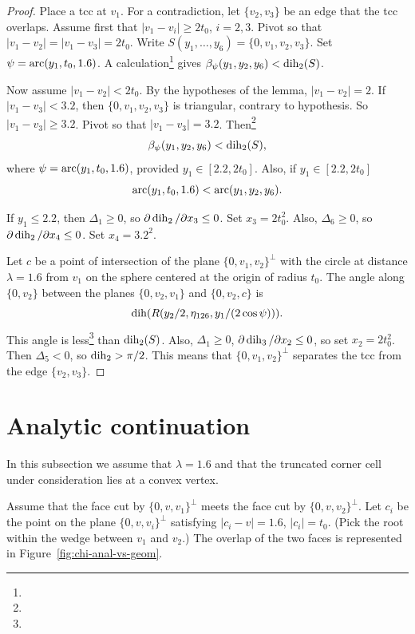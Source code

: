 \begin{proof}
Place a tcc at $v_1$. For a contradiction, let $\{v_2,v_3\}$ be an edge
that the tcc overlaps.  Assume first that $|v_1-v_i|\ge 2t_0$, $i=2,3$.
Pivot so that $|v_1-v_2|=|v_1-v_3|=2t_0$.    Write
$S(y_1,\ldots,y_6)=\{0,v_1,v_2,v_3\}$. Set $\psi=\operatorname{arc}(y_1,t_0,1.6)$.
A calculation\footnote{} %
gives $\beta_\psi(y_1,y_2,y_6)<\operatorname{dih}_2(S)$.

Now assume $|v_1-v_2|<2t_0$.  By the hypotheses of the lemma,
$|v_1-v_2|=2$.  If $|v_1-v_3|<3.2$, then $\{0,v_1,v_2,v_3\}$ is
triangular, contrary to hypothesis.  So $|v_1-v_3|\ge3.2$. Pivot so that
$|v_1-v_3|=3.2$. Then\footnote{} %
    $$\beta_\psi(y_1,y_2,y_6)< \operatorname{dih}_2(S),$$
where $\psi=\operatorname{arc}(y_1,t_0,1.6)$, provided $y_1\in[2.2,2t_0]$. Also, if
$y_1\in[2.2,2t_0]$
    $$\operatorname{arc}(y_1,t_0,1.6)<\operatorname{arc}(y_1,y_2,y_6).$$

If $y_1\le 2.2$, then $\Delta_1\ge0$, so
    $\partial\operatorname{dih}_2/\partial x_3\le 0$.
Set $x_3=2t_0^2$. Also, $\Delta_6\ge0$, so
    $\partial\operatorname{dih}_2/\partial x_4\le0$.
Set $x_4=3.2^2$.

Let $c$ be a point of intersection of the plane $\{0,v_1,v_2\}^\perp$ with
the circle at distance $\lambda=1.6$ from $v_1$ on the sphere centered
at the origin of radius $t_0$.  The angle along $\{0,v_2\}$ between the
planes $\{0,v_2,v_1\}$ and $\{0,v_2,c\}$ is
    $$\operatorname{dih}(R(y_2/2,\eta_{126},y_1/(2\cos\psi))).$$
This angle is less\footnote{} %
than $\operatorname{dih}_2(S)$. Also, $\Delta_1\ge0$,
$\partial\operatorname{dih}_3/\partial x_2\le0$, so set $x_2=2t_0^2$. Then
$\Delta_5<0$, so $\operatorname{dih}_2>\pi/2$.  This means that $\{0,v_1,v_2\}^\perp$
separates the tcc from the edge $\{v_2,v_3\}$. \end{proof}

\section{Analytic continuation}

In this subsection we assume that $\lambda=1.6$ and that the
truncated corner cell under consideration lies at a convex vertex.

Assume that the face cut by $\{0,v,v_1\}^\perp$ meets the face cut by
$\{0,v,v_2\}^\perp$.  Let $c_i$ be the point on the plane
$\{0,v,v_i\}^\perp$ satisfying $|c_i-v|=1.6$, $|c_i|=t_0$. (Pick the root
within the wedge between $v_1$ and $v_2$.) The overlap of the two faces
is represented in Figure~\ref{fig:chi-anal-vs-geom}.

